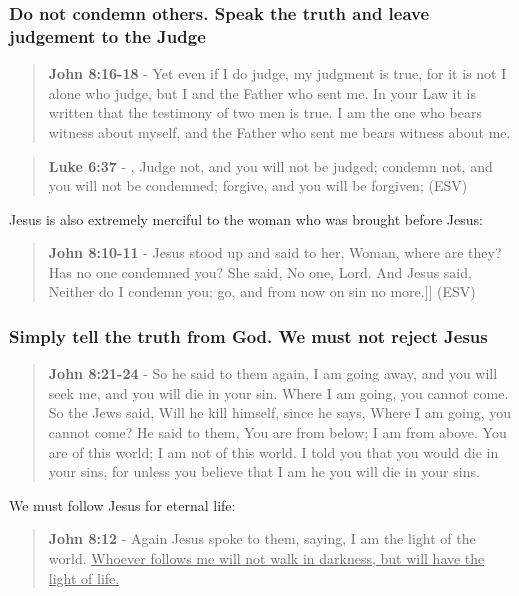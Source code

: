 \documentclass[11pt]{article}
\begin{document}
\subsubsection{Do not condemn others. Speak the truth and leave judgement to the Judge}
\label{sec:orgb3e0729}
\begin{quote}
\textbf{John 8:16-18} - Yet even if I do judge, my judgment is true, for it is not I alone who judge, but I and the Father who sent me. In your Law it is written that the testimony of two men is true. I am the one who bears witness about myself, and the Father who sent me bears witness about me.
\end{quote}

\begin{quote}
\textbf{Luke 6:37} - , Judge not, and you will not be judged; condemn not, and you will not be condemned; forgive, and you will be forgiven; (ESV)
\end{quote}

Jesus is also extremely merciful to the woman who was brought before Jesus:

\begin{quote}
\textbf{John 8:10-11} - Jesus stood up and said to her, Woman, where are they? Has no one condemned you? She said, No one, Lord. And Jesus said, Neither do I condemn you; go, and from now on sin no more.]] (ESV)
\end{quote}

\subsubsection{Simply tell the truth from God. We must not reject Jesus}
\label{sec:org906a476}
\begin{quote}
\textbf{John 8:21-24} - So he said to them again, I am going away, and you will seek me, and you will die in your sin. Where I am going, you cannot come. So the Jews said, Will he kill himself, since he says, Where I am going, you cannot come? He said to them, You are from below; I am from above. You are of this world; I am not of this world. I told you that you would die in your sins, for unless you believe that I am he you will die in your sins.
\end{quote}

We must follow Jesus for eternal life:

\begin{quote}
\textbf{John 8:12} - Again Jesus spoke to them, saying, I am the light of the world. \uline{Whoever follows me will not walk in darkness, but will have the light of life.}
\end{quote}
\end{document}
